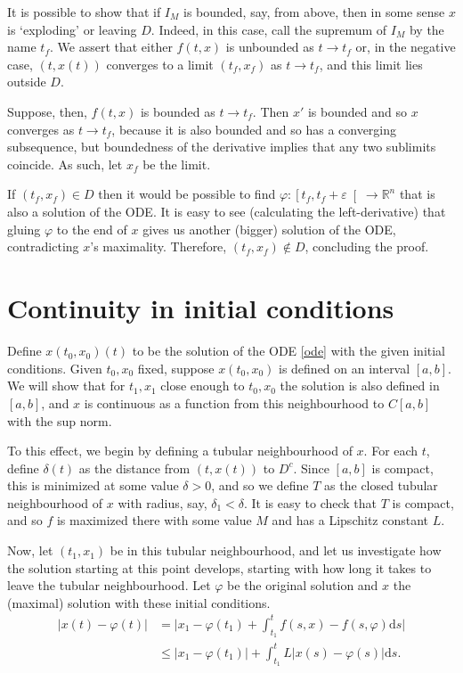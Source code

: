 \documentclass{article}
\newcommand{\R}{\mathbb{R}}
\newcommand{\dd}{\mathrm{d}}
\begin{document}
It is possible to show that if $I_M$ is bounded, say, from above, then in some sense $x$ is `exploding' or leaving $D$. Indeed, in this case, call the supremum of $I_M$ by the name $t_f$. We assert that either $f(t, x)$ is unbounded as $t \to t_f$ or, in the negative case, $(t, x(t))$ converges to a limit $(t_f, x_f)$ as $t \to t_f$, and this limit lies outside $D$.

Suppose, then, $f(t,x)$ is bounded as $t \to t_f$. Then $x'$ is bounded and so $x$ converges as $t \to t_f$, because it is also bounded and so has a converging subsequence, but boundedness of the derivative implies that any two sublimits coincide. As such, let $x_f$ be the limit.

If $(t_f, x_f) \in D$ then it would be possible to find $\varphi : \left[t_f, t_f + \varepsilon\right[ \to \R^n$ that is also a solution of the ODE. It is easy to see (calculating the left-derivative) that gluing $\varphi$ to the end of $x$ gives us another (bigger) solution of the ODE, contradicting $x$'s maximality. Therefore, $(t_f, x_f) \not \in D$, concluding the proof.

\section{Continuity in initial conditions}

Define $x(t_0, x_0)(t)$ to be the solution of the ODE \eqref{ode} with the given initial conditions. Given $t_0, x_0$ fixed, suppose $x(t_0, x_0)$ is defined on an interval $[a,b]$. We will show that for $t_1, x_1$ close enough to $t_0, x_0$ the solution is also defined in $[a,b]$, and $x$ is continuous as a function from this neighbourhood to $C[a,b]$ with the sup norm.

To this effect, we begin by defining a tubular neighbourhood of $x$. For each $t$, define $\delta(t)$ as the distance from $(t,x(t))$ to $D^c$. Since $[a,b]$ is compact, this is minimized at some value $ \delta > 0$, and so we define $T$ as the closed tubular neighbourhood of $x$ with radius, say, $\delta_1 < \delta$. It is easy to check that $T$ is compact, and so $f$ is maximized there with some value $M$ and has a Lipschitz constant $L$.

Now, let $(t_1, x_1)$ be in this tubular neighbourhood, and let us investigate how the solution starting at this point develops, starting with how long it takes to leave the tubular neighbourhood. Let $\varphi$ be the original solution and $x$ the (maximal) solution with these initial conditions.
\begin{align*}
\lvert x(t) - \varphi(t) \rvert &= \lvert x_1 - \varphi(t_1) + \int_{t_1}^t f(s, x) - f(s, \varphi) \dd s \rvert\\
&\leq \lvert x_1 - \varphi(t_1) \rvert + \int_{t_1}^t L \lvert x(s) - \varphi(s) \rvert \dd s.
\end{align*}
\end{document}

